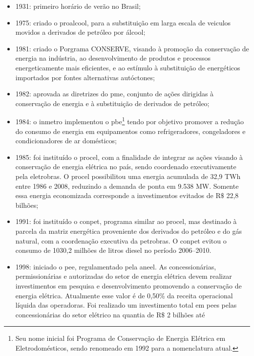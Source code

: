 \begin{itemize}
\item 1931: primeiro horário de verão no Brasil;
\item 1975: criado o \gls{proalcool}, para a substituição em larga escala de
veiculos movidos a derivados de petróleo por álcool; 
\item 1981: criado o Porgrama CONSERVE, visando à promoção da conservação de
energia na indústria, ao desenvolvimento de produtos e processos energeticamente
mais eficientes, e ao estímulo à substituição de energéticos importados por
fontes alternativas autóctones;
\item 1982: aprovada as diretrizes do \gls{pme}, conjunto de ações dirigidas à
conservação de energia e à substituição de derivados de petróleo;
\item 1984: o \gls{inmetro} implementou o \gls{pbe}\footnote{Seu nome inicial
foi Programa de Conservação de Energia Elétrica em Eletrodomésticos, sendo
renomeado em 1992 para a nomenclatura atual.} tendo por objetivo promover a
redução do consumo de energia em equipamentos como refrigeradores, congeladores e condicionadores
de ar domésticos;
\item 1985: foi instituído o \gls{procel}, com a finalidade de integrar as
ações visando à conservação de energia elétrica no país, sendo coordenado
executivamente pela \acrshort{eletrobras}. O \gls{procel} possibilitou uma energia acumulada de 32,9 TWh entre
1986 e 2008, reduzindo a demanda de ponta em 9.538 MW. Somente essa energia
economizada corresponde a investimentos evitados de $\text{R\$}$ 22,8 bilhões; 
\item 1991: foi instituído o \gls{conpet}, programa similar ao \gls{procel}, mas
destinado à parcela da matriz energética proveniente dos derivados do petróleo e
do gás natural, com a coordenação executiva da \acrshort{petrobras}. 
O \gls{conpet} evitou o consumo de 1030,2 milhões de litros diesel no período
2006--2010. 
\item 1998: iniciado o \gls{pee}, regulamentado pela \gls{aneel}. As concessionárias,
permissionárias e autorizadas do setor de energia elétrica devem realizar
investimentos em pesquisa e desenvolvimento promovendo a conservação de energia elétrica. 
Atualmente esse valor é de 0,50\% da receita operacional líquida das operadoras. 
Foi realizado um investimento total em \glspl{pee} 
pelas concessionárias do setor elétrico na quantia de $\text{R\$}$ 2 bilhões até

\end{itemize}
